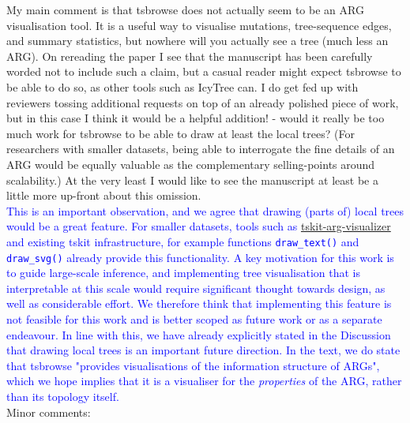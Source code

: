 \documentclass{article}
\begin{document}
My main comment is that tsbrowse does not actually seem to be an ARG visualisation tool. It is a useful way 
to visualise mutations, tree-sequence edges, and summary statistics, but nowhere will you actually see a tree 
(much less an ARG). On rereading the paper I see that the manuscript has been carefully worded not to include 
such a claim, but a casual reader might expect tsbrowse to be able to do so, as other tools such as IcyTree can. 
I do get fed up with reviewers tossing additional requests on top of an already polished piece of work, but 
in this case I think it would be a helpful addition! - would it really be too much work for tsbrowse to be 
able to draw at least the local trees? (For researchers with smaller datasets, being able to interrogate the 
fine details of an ARG would be equally valuable as the complementary selling-points around scalability.) At 
the very least I would like to see the manuscript at least be a little more up-front about this omission.\\
\textcolor{blue}{This is an important observation, and we agree that drawing (parts of) local trees would be 
a great feature. For smaller datasets, tools such as 
\href{https://pypi.org/project/tskit-arg-visualizer/}{tskit-arg-visualizer} and existing tskit infrastructure, 
for example functions \texttt{draw\_text()} and \texttt{draw\_svg()} already provide this functionality. A key 
motivation for this work is to guide large-scale inference, and implementing tree visualisation that is 
interpretable at this scale would require significant thought towards design, as well as considerable effort. 
We therefore think that implementing this feature is not feasible for this work and is better scoped as future 
work or as a separate endeavour. In line with this, we have already explicitly stated in the Discussion that drawing 
local trees is an important future direction. In the text, we do state that tsbrowse "provides visualisations of 
the information structure of ARGs", which we hope implies that it is a visualiser for the \textit{properties} 
of the ARG, rather than its topology itself.}\\

Minor comments:\\
\end{document}

